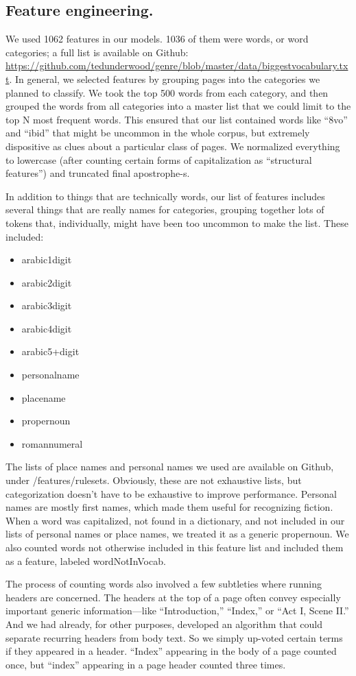 \documentclass[paper=a4, fontsize=12pt]{scrartcl}
\numberwithin{equation}{section}		%
\numberwithin{figure}{section}			%
\numberwithin{table}{section}				%
\begin{document}
\subsection{Feature engineering.}

We used 1062 features in our models. 1036 of them were words, or word categories; a full list is available on Github: \url{https://github.com/tedunderwood/genre/blob/master/data/biggestvocabulary.txt}. In general, we selected features by grouping pages into the categories we planned to classify. We took the top 500 words from each category, and then grouped the words from all categories into a master list that we could limit to the top N most frequent words. This ensured that our list contained words like ``8vo'' and ``ibid'' that might be uncommon in the whole corpus, but extremely dispositive as clues about a particular class of pages. We normalized everything to lowercase (after counting certain forms of capitalization as ``structural features'') and truncated final apostrophe-s.

In addition to things that are technically words, our list of features includes several things that are really names for categories, grouping together lots of tokens that, individually, might have been too uncommon to make the list. These included:
\begin{itemize}
\item arabic1digit
\item arabic2digit
\item arabic3digit
\item arabic4digit
\item arabic5+digit
\item personalname
\item placename
\item propernoun
\item romannumeral
\end{itemize}
The lists of place names and personal names we used are available on Github, under /features/rulesets. Obviously, these are not exhaustive lists, but categorization doesn't have to be exhaustive to improve performance. Personal names are mostly first names, which made them useful for recognizing fiction. When a word was capitalized, not found in a dictionary, and not included in our lists of personal names or place names, we treated it as a generic propernoun. We also counted words not otherwise included in this feature list and included them as a feature, labeled wordNotInVocab.

The process of counting words also involved a few subtleties where running headers are concerned. The headers at the top of a page often convey especially important generic information---like ``Introduction,'' ``Index,'' or ``Act I, Scene II.'' And we had already, for other purposes, developed an algorithm that could separate recurring headers from body text. So we simply up-voted certain terms if they appeared in a header. ``Index'' appearing in the body of a page counted once, but ``index'' appearing in a page header counted three times.
\end{document}
